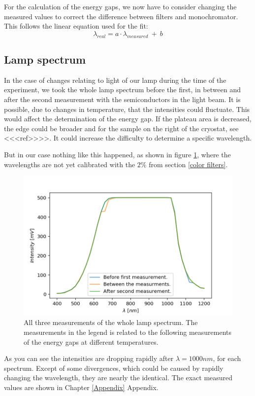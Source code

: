 \documentclass[]{article}
\begin{document}
For the calculation of the energy gaps, we now have to consider changing the measured values to correct the difference between filters and monochromator. This follows the linear equation used for the fit: 
\begin{equation}
\lambda_{real} = a\cdot \lambda_{measured} \ + \ b
\end{equation}

\subsection{Lamp spectrum} \label{lamp spectrum}
In the case of changes relating to light of our lamp during the time of the experiment, we took the whole lamp spectrum before the first, in between and after the second measurement with the semiconductors in the light beam. It is possible, due to changes in temperature, that the intensities could fluctuate. This would affect the determination of the energy gap. If the plateau area is decreased, the edge could be broader and for the sample on the right of the cryostat, see <<<ref>>>>. It could increase the difficulty to determine a specific wavelength.

 But in our case nothing like this happened, as shown in figure \ref{fig:lamp spectra}, where the wavelengths are not yet calibrated with the $2\%$ from section \ref{color filters}.

\begin{figure}[H]
\centering
\includegraphics[width=.8\textwidth]{Plots/All-Lamp-Spectra.png}
\caption{All three measurements of the whole lamp spectrum. The measurements in the legend is related to the following measurements of the energy gaps at different temperatures. }
\label{fig:lamp spectra}
\end{figure} 

As you can see the intensities are dropping rapidly after  $\lambda =1000nm$, for each spectrum. Except of some divergences, which could be caused by rapidly changing the wavelength, they are nearly the identical. The exact measured values are shown in Chapter \ref{Appendix} Appendix.
\end{document}
